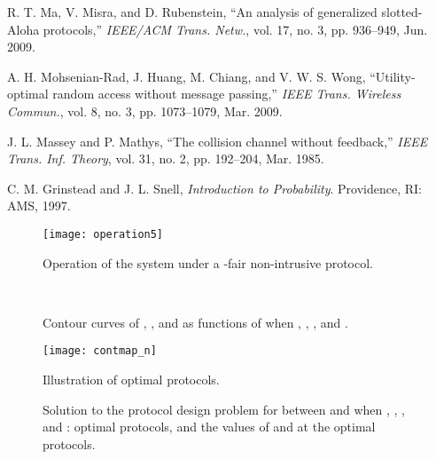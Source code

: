 \documentclass[12pt,draftclsnofoot,onecolumn]{IEEEtran}
\begin{document}
\begin{thebibliography}{99}
 R. T. Ma, V. Misra, and D. Rubenstein,
``An analysis of generalized slotted-Aloha protocols,''
\emph{IEEE/ACM Trans. Netw.}, vol. 17, no. 3, pp. 936--949, Jun. 2009.

 A. H. Mohsenian-Rad, J. Huang, M. Chiang, and V. W. S. Wong,
``Utility-optimal random access without message passing,'' \emph{IEEE
Trans. Wireless Commun.}, vol. 8, no. 3, pp. 1073--1079, Mar. 2009.

 J. L. Massey and P. Mathys, ``The collision channel without feedback,''
\emph{IEEE Trans. Inf. Theory}, vol. 31, no. 2, pp. 192--204, Mar. 1985.

 C. M. Grinstead and J. L. Snell, \emph{Introduction to Probability}.
Providence, RI: AMS, 1997.

\end{thebibliography}


\vfill

\begin{figure}[hb]
\begin{center}
\texttt{[image: operation5]}
\caption{Operation of the system under a -fair non-intrusive protocol.}
\label{fig:oper}
\end{center}
\end{figure}

\begin{figure}\centering
{}\\
\caption{Contour curves of
, , and  as functions of 
when , , , and .}
\label{fig:contour}\end{figure}

\begin{figure}
\begin{center}
\texttt{[image: contmap\_n]}
\caption{Illustration of optimal protocols.}
\label{fig:contmap}
\end{center}
\end{figure}

\begin{figure}\centering
{}\caption{Solution to the protocol design problem
for  between  and  when , , , and :
\protect{} optimal protocols, and
\protect{} the values of  and  at the optimal protocols.}
\label{fig:gvary}\end{figure}
\end{document}
